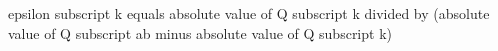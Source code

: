 epsilon subscript k equals absolute value of Q subscript k divided by (absolute value of Q subscript ab minus absolute value of Q subscript k)